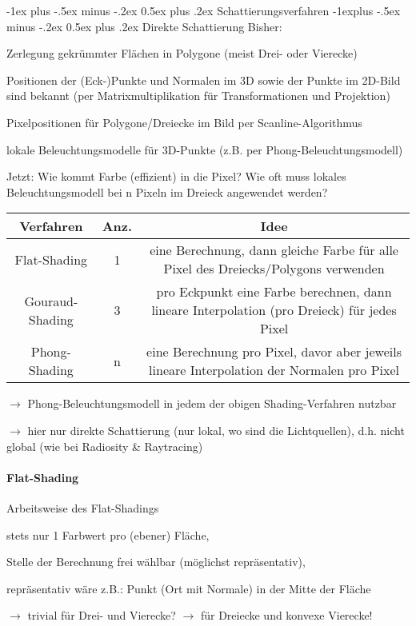 \documentclass[landscape]{article}
\makeatletter
\renewcommand{\section}{\@startsection{section}{1}{0mm}%
                                {-1ex plus -.5ex minus -.2ex}%
                                {0.5ex plus .2ex}%
                                {\normalfont\large\bfseries}}
\renewcommand{\subsection}{\@startsection{subsection}{2}{0mm}%
                                {-1explus -.5ex minus -.2ex}%
                                {0.5ex plus .2ex}%
                                {\normalfont\normalsize\bfseries}}
\makeatother
\begin{document}
\begin{multicols}{3}
  \newpage
  \section{Schattierungsverfahren}
  \subsection{ Direkte Schattierung}
  Bisher:
  \begin{itemize*}
    \item Zerlegung gekrümmter Flächen in Polygone (meist Drei- oder Vierecke)
    \item Positionen der (Eck-)Punkte und Normalen im 3D sowie der Punkte im 2D-Bild sind bekannt (per Matrixmultiplikation für Transformationen und Projektion)
    \item Pixelpositionen für Polygone/Dreiecke im Bild per Scanline-Algorithmus
    \item lokale Beleuchtungsmodelle für 3D-Punkte (z.B. per Phong-Beleuchtungsmodell)
  \end{itemize*}
  
  Jetzt: Wie kommt Farbe (effizient) in die Pixel? Wie oft muss lokales Beleuchtungsmodell bei n Pixeln im Dreieck angewendet werden?
  
  \begin{tabular}{c | c | c}
    Verfahren       & Anz. & Idee                                                                                        \\\hline
    Flat-Shading    & 1    & eine Berechnung, dann gleiche Farbe für alle Pixel des Dreiecks/Polygons verwenden          \\
    Gouraud-Shading & 3    & pro Eckpunkt eine Farbe berechnen, dann lineare Interpolation (pro Dreieck) für jedes Pixel \\
    Phong-Shading   & n    & eine Berechnung pro Pixel, davor aber jeweils lineare Interpolation der Normalen pro Pixel  \\
  \end{tabular}
  
  $\rightarrow$ Phong-Beleuchtungsmodell in jedem der obigen Shading-Verfahren nutzbar
  
  $\rightarrow$ hier nur direkte Schattierung (nur lokal, wo sind die Lichtquellen), d.h. nicht global (wie bei Radiosity \& Raytracing)
  
  \paragraph{Flat-Shading}
  Arbeitsweise des Flat-Shadings
  \begin{itemize*}
    \item stets nur 1 Farbwert pro (ebener) Fläche,
    \item Stelle der Berechnung frei wählbar (möglichst repräsentativ),
    \item repräsentativ wäre z.B.: Punkt (Ort mit Normale) in der Mitte der Fläche
    \item $\rightarrow$ trivial für Drei- und Vierecke? $\rightarrow$ für Dreiecke und konvexe Vierecke!
  \end{itemize*}
  

\end{multicols}
\end{document}
